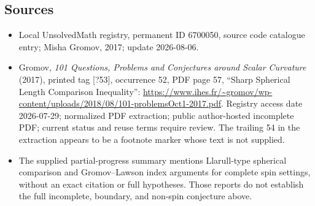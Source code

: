 \documentclass[11pt]{article}
\begin{document}
\subsection{Sources}
\begin{itemize}
\item Local UnsolvedMath registry, permanent ID 6700050, source code catalogue entry; Misha Gromov, 2017; update 2026-08-06.
\item Gromov, \emph{101 Questions, Problems and Conjectures around Scalar Curvature} (2017), printed tag [?53], occurrence 52, PDF page 57, ``Sharp Spherical Length Comparison Inequality'': \url{https://www.ihes.fr/~gromov/wp-content/uploads/2018/08/101-problemsOct1-2017.pdf}. Registry access date 2026-07-29; normalized PDF extraction; public author-hosted incomplete PDF; current status and reuse terms require review. The trailing 54 in the extraction appears to be a footnote marker whose text is not supplied.
\item The supplied partial-progress summary mentions Llarull-type spherical comparison and Gromov--Lawson index arguments for complete spin settings, without an exact citation or full hypotheses. Those reports do not establish the full incomplete, boundary, and non-spin conjecture above.
\end{itemize}
\end{document}
